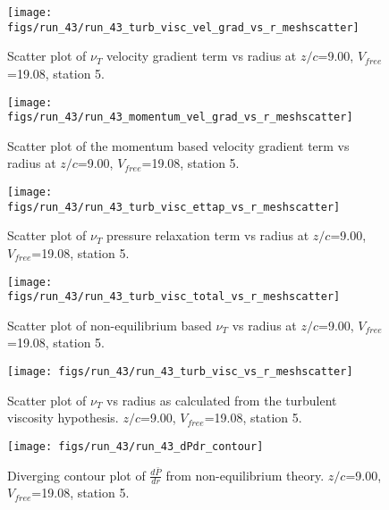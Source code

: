 \begin{figure}[H]
\centering
\texttt{[image: figs/run\_43/run\_43\_turb\_visc\_vel\_grad\_vs\_r\_meshscatter]}
\caption{Scatter plot of $\nu_T$ velocity gradient term vs radius at $z/c$=9.00, $V_{free}$=19.08, station 5.}
\end{figure}


\begin{figure}[H]
\centering
\texttt{[image: figs/run\_43/run\_43\_momentum\_vel\_grad\_vs\_r\_meshscatter]}
\caption{Scatter plot of the momentum based velocity gradient term vs radius at $z/c$=9.00, $V_{free}$=19.08, station 5.}
\end{figure}


\begin{figure}[H]
\centering
\texttt{[image: figs/run\_43/run\_43\_turb\_visc\_ettap\_vs\_r\_meshscatter]}
\caption{Scatter plot of $\nu_T$ pressure relaxation term vs radius at $z/c$=9.00, $V_{free}$=19.08, station 5.}
\end{figure}


\begin{figure}[H]
\centering
\texttt{[image: figs/run\_43/run\_43\_turb\_visc\_total\_vs\_r\_meshscatter]}
\caption{Scatter plot of non-equilibrium based $\nu_T$ vs radius at $z/c$=9.00, $V_{free}$=19.08, station 5.}
\end{figure}


\begin{figure}[H]
\centering
\texttt{[image: figs/run\_43/run\_43\_turb\_visc\_vs\_r\_meshscatter]}
\caption{Scatter plot of $\nu_T$ vs radius as calculated from the turbulent viscosity hypothesis. $z/c$=9.00, $V_{free}$=19.08, station 5.}
\end{figure}


\begin{figure}[H]
\centering
\texttt{[image: figs/run\_43/run\_43\_dPdr\_contour]}
\caption{Diverging contour plot of $\frac{d\bar{P}}{dr}$ from non-equilibrium theory. $z/c$=9.00, $V_{free}$=19.08, station 5.}
\end{figure}


